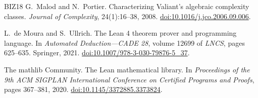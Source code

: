 \begin{thebibliography}{BIZ18}
G.~Malod and N.~Portier.
\newblock Characterizing Valiant's algebraic complexity classes.
\newblock \emph{Journal of Complexity}, 24(1):16--38, 2008.
\newblock \href{https://doi.org/10.1016/j.jco.2006.09.006}{doi:10.1016/j.jco.2006.09.006}.

L.~de Moura and S.~Ullrich.
\newblock The {Lean 4} theorem prover and programming language.
\newblock In \emph{Automated Deduction---CADE 28}, volume 12699 of \emph{LNCS},
  pages 625--635. Springer, 2021.
\newblock \href{https://doi.org/10.1007/978-3-030-79876-5_37}{doi:10.1007/978-3-030-79876-5\_37}.

The mathlib Community.
\newblock The {Lean} mathematical library.
\newblock In \emph{Proceedings of the 9th ACM SIGPLAN International Conference on
  Certified Programs and Proofs}, pages 367--381, 2020.
\newblock \href{https://doi.org/10.1145/3372885.3373824}{doi:10.1145/3372885.3373824}.

\end{thebibliography}
